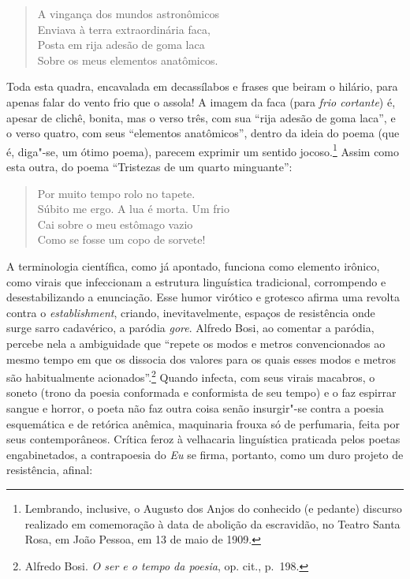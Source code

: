 \begin{verse}
A vingança dos mundos astronômicos\\
Enviava à terra extraordinária faca,\\
Posta em rija adesão de goma laca\\
Sobre os meus elementos anatômicos.
\end{verse}

Toda esta quadra, encavalada em decassílabos e frases que beiram o
hilário, para apenas falar do vento frio que o assola! A imagem da faca
(para \textit{frio cortante}) é, apesar de clichê, bonita, mas o verso
três, com sua “rija adesão de goma laca”, e o verso quatro, com seus
“elementos anatômicos”, dentro da ideia do poema (que é, diga"-se, um
ótimo poema), parecem exprimir um sentido jocoso.\footnote{ Lembrando,
inclusive, o Augusto dos Anjos do conhecido (e pedante) discurso
realizado em comemoração à data de abolição da escravidão, no Teatro
Santa Rosa, em João Pessoa, em 13 de maio de 1909.} Assim como esta
outra, do poema “Tristezas de um quarto minguante”:

\begin{verse}
Por muito tempo rolo no tapete.\\
Súbito me ergo. A lua é morta. Um frio\\
Cai sobre o meu estômago vazio\\
Como se fosse um copo de sorvete!
\end{verse}

A terminologia científica, como já apontado, funciona como elemento
irônico, como virais que infeccionam a estrutura linguística
tradicional, corrompendo e desestabilizando a enunciação. Esse humor
virótico e grotesco afirma uma revolta contra o
\textit{establishment}, criando, inevitavelmente, espaços de
resistência onde surge sarro cadavérico, a paródia \textit{gore}.
Alfredo Bosi, ao comentar a paródia, percebe nela a ambiguidade que
“repete os modos e metros convencionados ao mesmo tempo em que os dissocia dos
valores para os quais esses modos e metros são habitualmente acionados”.\footnote{Alfredo Bosi.
\textit{O ser e o tempo da poesia}, op. cit., p.~198.} 
Quando infecta, com seus virais macabros, o soneto
(trono da poesia conformada e conformista de seu tempo) e o faz
espirrar sangue e horror, o poeta não faz outra coisa senão insurgir"-se
contra a poesia esquemática e de retórica anêmica, maquinaria frouxa só
de perfumaria, feita por seus contemporâneos. Crítica feroz à
velhacaria linguística praticada pelos poetas engabinetados, a
contrapoesia do \textit{Eu} se firma, portanto, como um duro projeto de
resistência, afinal:

